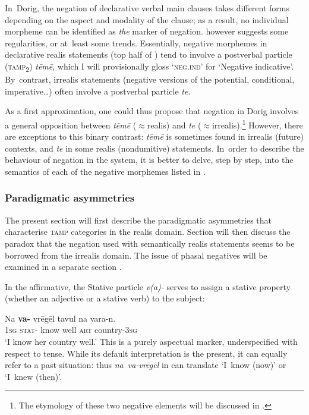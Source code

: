 \documentclass[output=paper,colorlinks,citecolor=brown,draft]{langscibook}
\begin{document}
In~Dorig, the negation of declarative verbal main clauses takes different forms depending on the aspect and modality of the clause; as a result, no individual morpheme can be identified as \textit{the} marker of negation.  however suggests some regularities, or at~least some trends. Essentially, negative morphemes in declarative realis statements (top half of ) tend to involve a postverbal particle (\textsc{tamp}\textsubscript{2}) \textit{tēmē}, which I will provisionally gloss ‘\textsc{neg.ind}’ for ‘Negative indicative’. By~contrast, irrealis statements (negative versions of the potential, conditional, imperative…) often involve a postverbal particle \textit{te}.

As a first approximation, one could thus propose that negation in Dorig \mbox{involves} a general opposition between \textit{tēmē} (${\approx}$realis) and \textit{te} (${\approx}$irrealis).\footnote{The etymology of these two negative elements will be discussed in .} However, there are exceptions to this binary contrast: \textit{tēmē} is sometimes found in irrealis (future) contexts, and \textit{te} in some realis (nondumitive) statements. In~order to describe the behaviour of negation in the system, it is better to delve, step by step, into the semantics of each of the negative morphemes listed in . 

\subsubsection{Paradigmatic asymmetries}\label{sec:dor:2.1.4}

The present section will first describe the paradigmatic asymmetries that characterise \textsc{tamp} categories in the realis domain. Section  will then discuss the paradox that the negation used with semantically realis statements seems to be borrowed from the irrealis domain. The issue of phasal negatives will be examined in a separate section .

In the affirmative, the Stative particle \textit{v(a)-} serves to assign a stative property (whether an adjective or a stative verb) to the subject:

\ea\label{ex:dor:tavul}
        \gll  Na \textbf{va-} vrēgēl tavul na vara-n.\\ 
              \textsc{1sg} \textsc{stat-} know well \textsc{art} country-\textsc{3sg}\\
        \glt ‘I know her country well.’
\z
This is a purely aspectual marker, underspecified with respect to tense. While its default interpretation is the present, it can equally refer to a past situation: thus \textit{na~va-vrēgēl} in  can translate ‘I~know (now)’ or ‘I~knew (then)’.
     
\end{document}
